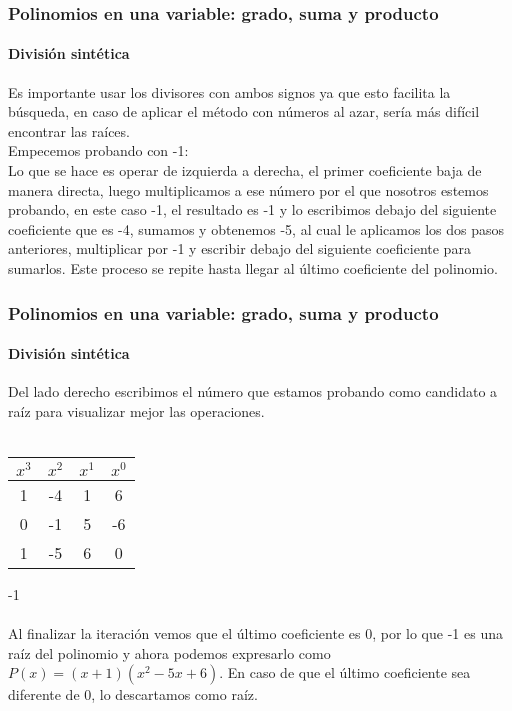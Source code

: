 \documentclass[11pt]{beamer}
\begin{document}
\begin{frame}
\frametitle{Polinomios en una variable: grado, suma y producto}
\framesubtitle{División sintética}
Es importante usar los divisores con ambos signos ya que esto facilita la búsqueda, en caso de aplicar el método con números al azar, sería más difícil encontrar las raíces. \\
Empecemos probando con -1:\\
Lo que se hace es operar de izquierda a derecha, el primer coeficiente baja de manera directa, luego multiplicamos a ese número por el que nosotros estemos probando, en este caso -1, el resultado es -1 y lo escribimos debajo del siguiente coeficiente que es -4, sumamos y obtenemos -5, al cual le aplicamos los dos pasos anteriores, multiplicar por -1 y escribir debajo del siguiente coeficiente para sumarlos. Este proceso se repite hasta llegar al último coeficiente del polinomio.
\end{frame}

\begin{frame}
\frametitle{Polinomios en una variable: grado, suma y producto}
\framesubtitle{División sintética}
Del lado derecho escribimos el número que estamos probando como candidato a raíz para visualizar mejor las operaciones.\\ \hspace{0cm} \\
\begin{tabular}{c|c|c|c|}
$x^3$ & $x^2$ & $x^1$ & $x^0$\\ \hline
1 & -4 & 1 & 6 \\ 
0 & -1 & 5 & -6 \\ \hline
1 & -5 & 6 & 0
\end{tabular}
-1\\ \hspace{0cm} \\
Al finalizar la iteración vemos que el último coeficiente es 0, por lo que -1 es una raíz del polinomio y ahora podemos expresarlo como $P(x) = (x + 1)(x^2 -5x + 6)$. En caso de que el último coeficiente sea diferente de 0, lo descartamos como raíz.
\end{frame}
\end{document}

